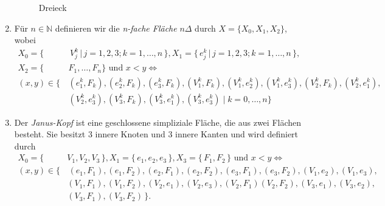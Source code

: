 \documentclass[12pt,titlepage]{article}
\begin{document}
\begin{bsp}
\begin{enumerate}
\begin{figure}[h]
\caption{Dreieck}
\end{figure}

 \item
 Für $n \in \mathbb{N}$ definieren wir die \emph{n-fache Fläche} $n \Delta$ durch $X=\{X_{0},X_{1},X_{2}\}$, wobei
 \begin{align*}
  X_{0}=\{& \,V_{j}^{k}\,\vert\, j=1,2,3 ;k=1,\ldots,n\,\}, X_{1}=\{\,e_{j}^{k}\,\vert\, j=1,2,3 ;k=1,\ldots,n\,\},\\
   X_{2}=\{&F_{1},\ldots,F_{n}\} \text{ und } x<y \Leftrightarrow \\
 (x,y)\in \{\,&(e_{1}^k,F_{k}),(e_{2}^k,F_{k}),(e_{3}^k,F_{k}),(V_{1}^k,F_{k}),(V_{1}^k,e_{2}^k),(V_{1}^k,e_{3}^k),(V_{2}^k,F_{k}), (V_{2}^k,e_{1}^k),\\ &(V_{2}^k,e_{3}^k),
 (V_{3}^k,F_{k}),(V_{3}^k,e_{1}^k),(V_{3}^k,e_{3}^k)\mid k=0,\ldots,n\} 
\end{align*}
 
 \newpage
 \item 
 Der \emph{Janus-Kopf} ist eine geschlossene simpliziale Fläche, die aus zwei Flächen besteht.	Sie besitzt 3 innere Knoten und  3 innere Kanten und wird definiert durch
 \begin{align*}
 X_{0}=\{\,&V_{1},V_{2},V_{3}\,\} ,X_{1}=\{\,e_{1},e_{2},e_{3}\,\},X_{3}=\{\, F_{1},F_{2}\,\}  \text{ und } x<y \Leftrightarrow \\
 (x,y)\in\{&\,(e_{1},F_{1}),(e_{1},F_{2}),(e_{2},F_{1}),(e_{2},F_{2}),(e_{3},F_{1}),(e_{3},F_{2}),(V_{1},e_{2}),(V_{1},e_{3}),\\ &(V_{1},F_{1}),
  (V_{1},F_{2}),(V_{2},e_{1}),(V_{2},e_{3}),(V_{2},F_{1})
 (V_{2},F_{2}), (V_{3},e_{1}), (V_{3},e_{2}),\\&(V_{3},F_{1}),(V_{3},F_{2}) \,\}.
 \end{align*}


\end{enumerate}
\end{bsp}
\end{document}
